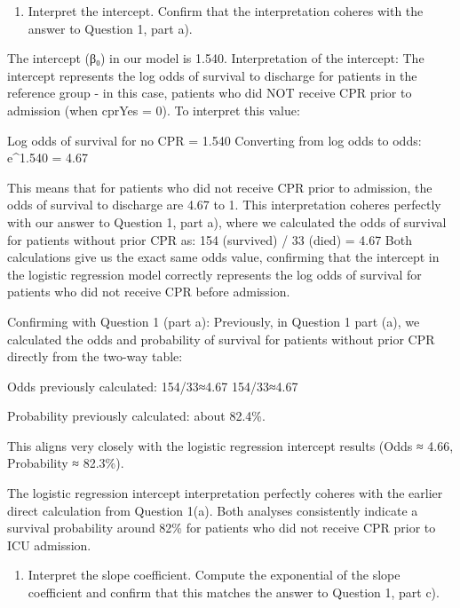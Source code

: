 \documentclass[
]{article}
\providecommand{\tightlist}{%
  \setlength{\itemsep}{0pt}\setlength{\parskip}{0pt}}
\begin{document}
\begin{enumerate}
\def\labelenumi{\alph{enumi})}
\setcounter{enumi}{1}
\tightlist
\item
  Interpret the intercept. Confirm that the interpretation coheres with
  the answer to Question 1, part a).
\end{enumerate}

The intercept (β₀) in our model is 1.540. Interpretation of the
intercept: The intercept represents the log odds of survival to
discharge for patients in the reference group - in this case, patients
who did NOT receive CPR prior to admission (when cprYes = 0). To
interpret this value:

Log odds of survival for no CPR = 1.540 Converting from log odds to
odds: e\^{}1.540 = 4.67

This means that for patients who did not receive CPR prior to admission,
the odds of survival to discharge are 4.67 to 1. This interpretation
coheres perfectly with our answer to Question 1, part a), where we
calculated the odds of survival for patients without prior CPR as: 154
(survived) / 33 (died) = 4.67 Both calculations give us the exact same
odds value, confirming that the intercept in the logistic regression
model correctly represents the log odds of survival for patients who did
not receive CPR before admission.

Confirming with Question 1 (part a): Previously, in Question 1 part (a),
we calculated the odds and probability of survival for patients without
prior CPR directly from the two-way table:

Odds previously calculated: 154/33≈4.67 154/33≈4.67

Probability previously calculated: about 82.4\%.

This aligns very closely with the logistic regression intercept results
(Odds ≈ 4.66, Probability ≈ 82.3\%).

The logistic regression intercept interpretation perfectly coheres with
the earlier direct calculation from Question 1(a). Both analyses
consistently indicate a survival probability around 82\% for patients
who did not receive CPR prior to ICU admission.

\begin{enumerate}
\def\labelenumi{\alph{enumi})}
\setcounter{enumi}{2}
\tightlist
\item
  Interpret the slope coefficient. Compute the exponential of the slope
  coefficient and confirm that this matches the answer to Question 1,
  part c).
\end{enumerate}
\end{document}
